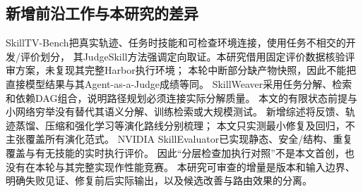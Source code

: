 \subsection{新增前沿工作与本研究的差异}
SkillTV-Bench把真实轨迹、任务时技能和可检查环境连接，使用任务不相交的开发/评价划分，
其JudgeSkill方法强调定向取证\citep{S01}。本研究借用固定评价数据核验评审方案，未复现其完整Harbor执行环境；
本轮中断部分缺产物快照，因此不能把直接模型结果与其Agent-as-a-Judge成绩等同。
SkillWeaver采用任务分解、检索和依赖DAG组合\citep{S02}，说明路径规划必须连接实际分解质量。
本文的有限状态前提与小网络穷举没有替代其语义分解、训练检索或大规模测试。
新增综述将反馈、轨迹蒸馏、压缩和强化学习等演化路线分别梳理\citep{S03}；
本文只实测最小修复及回归，不主张覆盖所有演化范式。
NVIDIA SkillEvaluator已实现静态、安全/结构、重复覆盖与有无技能的实时执行评价\citep{S04}。
因此“分层检查加执行对照”不是本文首创，也没有在本轮与其完整实现作性能竞赛。
本研究可审查的增量是版本和输入边界、明确失败见证、修复前后实际输出，以及候选改善与路由效果的分离。
